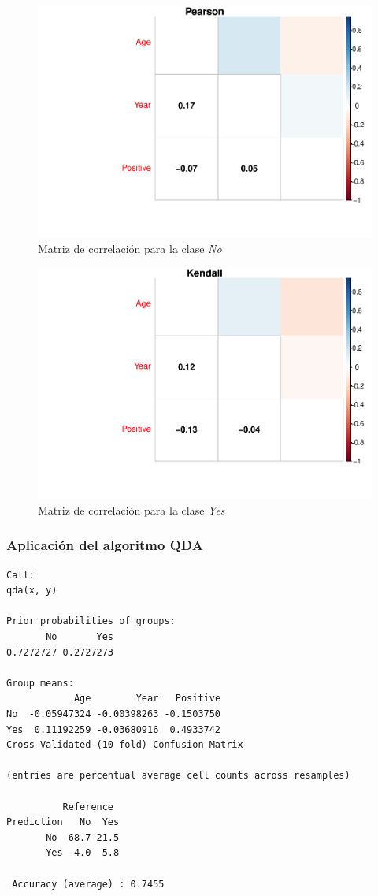 \begin{figure}[H]\center\includegraphics[width=.9\linewidth]{img/Clasificacion_files/figure-latex/unnamed-chunk-26-1}\caption{Matriz de correlación para la clase \textit{No}}\end{figure}

\begin{figure}[H]\center\includegraphics[width=.9\linewidth]{img/Clasificacion_files/figure-latex/unnamed-chunk-26-2}\caption{Matriz de correlación para la clase \textit{Yes}}\end{figure}

\subsubsection{Aplicación del algoritmo QDA}

\begin{verbatim}
Call:
qda(x, y)

Prior probabilities of groups:
       No       Yes 
0.7272727 0.2727273 

Group means:
            Age        Year   Positive
No  -0.05947324 -0.00398263 -0.1503750
Yes  0.11192259 -0.03680916  0.4933742
Cross-Validated (10 fold) Confusion Matrix 

(entries are percentual average cell counts across resamples)
 
          Reference
Prediction   No  Yes
       No  68.7 21.5
       Yes  4.0  5.8
                            
 Accuracy (average) : 0.7455
\end{verbatim}

